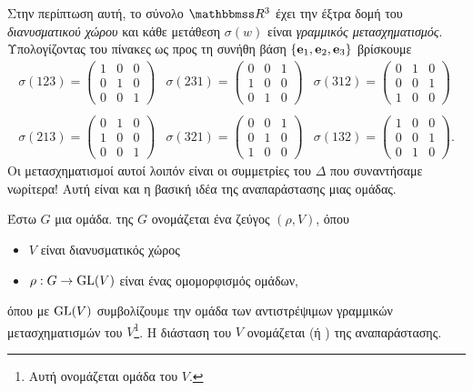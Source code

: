 \documentclass[12pt,a4paper,reqno]{amsart}
\newcommand{\defn}[1]{{\color{mylightblue}{#1}}}
\begin{document}
Στην περίπτωση αυτή, το σύνολο $\RR^3$ έχει την έξτρα δομή του \emph{διανυσματικού χώρου} και κάθε μετάθεση $\sigma(w)$ είναι \emph{γραμμικός μετασχηματισμός}. Υπολογίζοντας του πίνακες ως προς τη συνήθη βάση $\{\mathbf{e}_1, \mathbf{e}_2, \mathbf{e}_3\}$ βρίσκουμε 
\[
\begin{array}{ccc}
    \sigma(123) = 
    \begin{pmatrix} 
        1 & 0 & 0 \\ 
        0 & 1 & 0 \\ 
        0 & 0 & 1 
    \end{pmatrix}  
    & \sigma(231) = 
    \begin{pmatrix} 
        0 & 0 & 1 \\ 
        1 & 0 & 0 \\ 
        0 & 1 & 0 
    \end{pmatrix}
    & \sigma(312) = 
    \begin{pmatrix} 
        0 & 1 & 0 \\ 
        0 & 0 & 1 \\ 
        1 & 0 & 0 
    \end{pmatrix} \\
     &  &  \\
    \sigma(213) =
    \begin{pmatrix} 
        0 & 1 & 0 \\ 
        1 & 0 & 0 \\ 
        0 & 0 & 1 
    \end{pmatrix} 
    & \sigma(321) = 
    \begin{pmatrix} 
        0 & 0 & 1 \\ 
        0 & 1 & 0 \\ 
        1 & 0 & 0 
    \end{pmatrix} 
    & \sigma(132) = 
    \begin{pmatrix} 
        1 & 0 & 0 \\ 
        0 & 0 & 1 \\ 
        0 & 1 & 0 
    \end{pmatrix}.
\end{array}
\]
Οι μετασχηματισμοί αυτοί λοιπόν είναι οι συμμετρίες του $\Delta$ που συναντήσαμε νωρίτερα! Αυτή είναι και η βασική ιδέα της αναπαράστασης μιας ομάδας.

\begin{definition}
    \label{def:representation}
    Έστω $G$ μια ομάδα. \defn{Αναπαράσταση} της $G$ ονομάζεται ένα ζεύγος $(\rho, V)$, όπου 
    \begin{itemize}
    \item $V$ είναι διανυσματικός χώρος 
    \item $\rho : G \rightarrow \mathrm{GL}(V)$ είναι ένας ομομορφισμός ομάδων, 
    \end{itemize}
    όπου με $\mathrm{GL}(V)$ συμβολίζουμε την ομάδα των αντιστρέψιμων γραμμικών μετασχηματισμών του $V$\footnote{Αυτή ονομάζεται \defn{γενική γραμμική} ομάδα του $V$.}. Η διάσταση του $V$ ονομάζεται \defn{διάσταση} (ή \defn{βαθμός}) της αναπαράστασης.
\end{definition}
\end{document}
